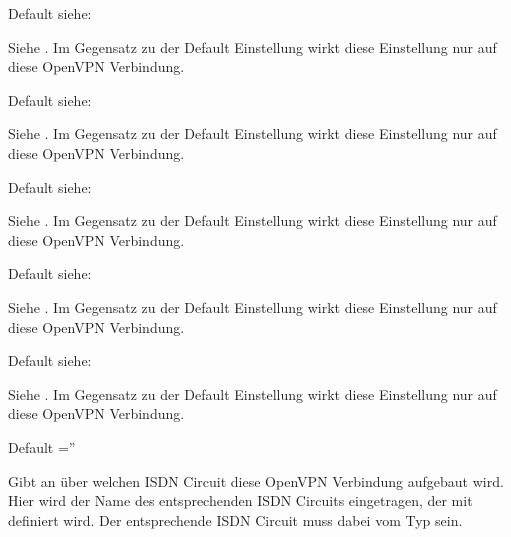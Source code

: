 \begin{description}
  Default siehe: 

  Siehe . Im
  Gegensatz zu der Default Einstellung wirkt diese Einstellung nur auf
  diese OpenVPN Verbindung.


  Default siehe: 

  Siehe . Im Gegensatz zu der
  Default Einstellung wirkt diese Einstellung nur auf diese OpenVPN
  Verbindung.


  Default siehe: 

  Siehe . Im
  Gegensatz zu der Default Einstellung wirkt diese Einstellung nur auf
  diese OpenVPN Verbindung.


  Default siehe: 

  Siehe . Im
  Gegensatz zu der Default Einstellung wirkt diese Einstellung nur auf
  diese OpenVPN Verbindung.


  Default siehe: 

  Siehe . Im
  Gegensatz zu der Default Einstellung wirkt diese Einstellung nur auf
  diese OpenVPN Verbindung.


  Default =''

  Gibt an über welchen ISDN Circuit diese OpenVPN Verbindung aufgebaut
  wird. Hier wird der Name des entsprechenden ISDN Circuits
  eingetragen, der mit  definiert
  wird. Der entsprechende ISDN Circuit muss dabei vom Typ 
  sein.



\end{description}
